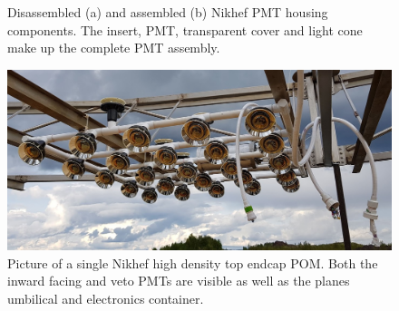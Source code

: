 \begin{figure} %
    \centering
    \quad
    \caption[Disassembled and assembled Nikhef PMT housing components.]
    {Disassembled (a) and assembled (b) Nikhef PMT housing components. The insert, PMT,
        transparent cover and light cone make up the complete PMT assembly.}
\end{figure}

\begin{figure} %
    \includegraphics[width=\textwidth]{diagrams/4-chips/single_plane.jpg}
    \caption[Picture of a Nikhef POM.]
    {Picture of a single Nikhef high density top endcap POM. Both the inward facing and veto PMTs
        are visible as well as the planes umbilical and electronics container.}
    \label{fig:single_plane}
\end{figure}

